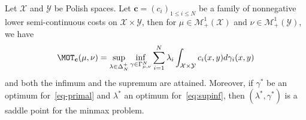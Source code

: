 \begin{lemma}
\label{lem:technical-lemma-primal}
Let $\mathcal{X}$ and $\mathcal{Y}$ be Polish spaces. Let $\mathbf{c}=(c_i)_{1\leq i\leq N}$ be a family of nonnegative lower semi-continuous costs on $\mathcal{X}\times \mathcal{Y}$, then for $\mu\in\mathcal{M}^1_+(\mathcal{X})$ and  $\nu\in\mathcal{M}^1_+(\mathcal{Y})$, we have
\begin{align}
\label{eq:supinf}
\MOT_{\mathbf{c}}(\mu,\nu)= \sup_{\lambda\in\Delta_N^{+}}\inf_{\gamma\in\Gamma_{\mu,\nu}^N} \sum_{i=1}^N\lambda_i\int_{\mathcal{X}\times\mathcal{Y}}c_i(x,y)d\gamma_i(x,y)
\end{align}
and both the infimum and the supremum are attained. Moreover, if $\gamma^*$ be an optimum for~\eqref{eq-primal} and $\lambda^*$ an optimum for~\eqref{eq:supinf}, then $(\lambda^*,\gamma^*)$ is a saddle point for the minmax problem.
\end{lemma}

